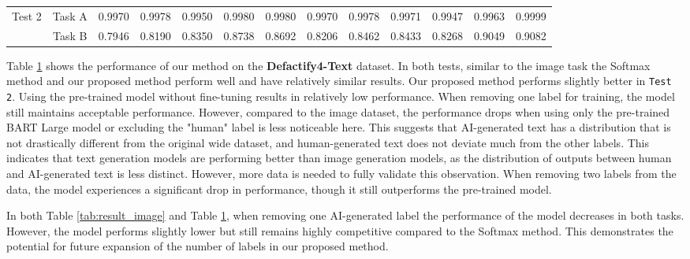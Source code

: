\begin{table}[h]
{\begin{tabular}{cc|ccccccccccc}
\multirow{2}{*}{Test 2}          & Task A          & \multicolumn{1}{c|}{0.9970}                                                                        & \multicolumn{1}{c|}{0.9978}       & 0.9950                        & 0.9980     & 0.9980      & 0.9970    & 0.9978    & 0.9971 & \multicolumn{1}{c|}{0.9947}    & 0.9963  & 0.9999 \\
                                 & Task B          & \multicolumn{1}{c|}{0.7946}                                                                        & \multicolumn{1}{c|}{0.8190}       & 0.8350                        & 0.8738     & 0.8692      & 0.8206    & 0.8462    & 0.8433 & \multicolumn{1}{c|}{0.8268}    & 0.9049  & 0.9082 \\ \hline
\end{tabular}}
\label{tab:result_text}
\end{table}

Table \ref{tab:result_text} shows the performance of our method on the \textbf{Defactify4-Text} dataset. In both tests, similar to the image task the Softmax method and our proposed method perform well and have relatively similar results. Our proposed method performs slightly better in \texttt{Test 2}. Using the pre-trained model without fine-tuning results in relatively low performance. When removing one label for training, the model still maintains acceptable performance. However, compared to the image dataset, the performance drops when using only the pre-trained BART Large model or excluding the "human" label is less noticeable here. This suggests that AI-generated text has a distribution that is not drastically different from the original wide dataset, and human-generated text does not deviate much from the other labels. This indicates that text generation models are performing better than image generation models, as the distribution of outputs between human and AI-generated text is less distinct. However, more data is needed to fully validate this observation. When removing two labels from the data, the model experiences a significant drop in performance, though it still outperforms the pre-trained model.

In both Table \ref{tab:result_image} and Table \ref{tab:result_text}, when removing one AI-generated label the performance of the model decreases in both tasks. However, the model performs slightly lower but still remains highly competitive compared to the Softmax method. This demonstrates the potential for future expansion of the number of labels in our proposed method.

